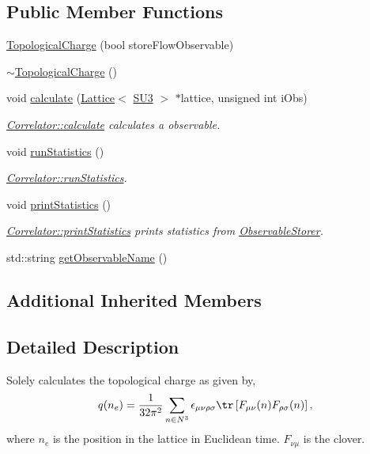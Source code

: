 \subsection*{Public Member Functions}
\begin{DoxyCompactItemize}
\item 
\mbox{\hyperlink{class_topological_charge_a415e32f865f7b5c83f4ac4471838d514}{Topological\+Charge}} (bool store\+Flow\+Observable)
\item 
\mbox{\hyperlink{class_topological_charge_aec647c5c45f8532639cebcac10865f2e}{$\sim$\+Topological\+Charge}} ()
\item 
void \mbox{\hyperlink{class_topological_charge_a8ed78c28c3484df04b1cb24187de2f5b}{calculate}} (\mbox{\hyperlink{class_lattice}{Lattice}}$<$ \mbox{\hyperlink{class_s_u3}{S\+U3}} $>$ $\ast$lattice, unsigned int i\+Obs)
\begin{DoxyCompactList}\small\item\em \mbox{\hyperlink{class_correlator_ab33502ff305f891c5c2e6d66a26a0247}{Correlator\+::calculate}} calculates a observable. \end{DoxyCompactList}\item 
void \mbox{\hyperlink{class_topological_charge_ab9afadb9f37e638c0a168ebab5d41353}{run\+Statistics}} ()
\begin{DoxyCompactList}\small\item\em \mbox{\hyperlink{class_correlator_a35197b1d12b62ef30b79c0138a26456e}{Correlator\+::run\+Statistics}}. \end{DoxyCompactList}\item 
void \mbox{\hyperlink{class_topological_charge_ad56263921d283d315b04ab40c9594a2c}{print\+Statistics}} ()
\begin{DoxyCompactList}\small\item\em \mbox{\hyperlink{class_correlator_a2168d677f547769784781d2e2aaa53cf}{Correlator\+::print\+Statistics}} prints statistics from \mbox{\hyperlink{class_observable_storer}{Observable\+Storer}}. \end{DoxyCompactList}\item 
std\+::string \mbox{\hyperlink{class_topological_charge_ad12d246692f3d9ea0ef591814010ef88}{get\+Observable\+Name}} ()
\end{DoxyCompactItemize}
\subsection*{Additional Inherited Members}


\subsection{Detailed Description}
Solely calculates the topological charge as given by, \[ q(n_e) = \frac{1}{32\pi^2} \sum_{n\in N^3} \epsilon_{\mu\nu\rho\sigma} \tr\left[F_{\mu\nu}(n)F_{\rho\sigma}(n)\right], \] where $n_e$ is the position in the lattice in Euclidean time. $F_{\nu\mu}$ is the clover. 

